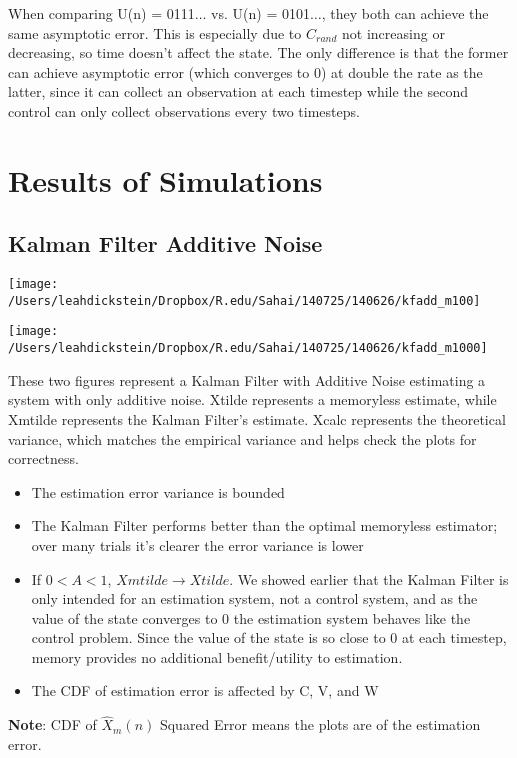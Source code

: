 \documentclass[leqno,twocolumn]{article}
\begin{document}
When comparing U(n) = 0111$\dots$ vs. U(n) = 0101$\dots$, they both can achieve the same asymptotic error. This is especially due to $C_{rand}$ not increasing or decreasing, so time doesn't affect the state. The only difference is that the former can achieve asymptotic error (which converges to 0) at double the rate as the latter, since it can collect an observation at each timestep while the second control can only collect observations every two timesteps.

\onecolumn
\section{Results of Simulations}
\subsection{Kalman Filter Additive Noise}
\begin{minipage}[c]{0.5\textwidth}
\texttt{[image: /Users/leahdickstein/Dropbox/R.edu/Sahai/140725/140626/kfadd\_m100]}
\end{minipage}
\begin{minipage}[c]{0.5\textwidth}
\texttt{[image: /Users/leahdickstein/Dropbox/R.edu/Sahai/140725/140626/kfadd\_m1000]}
\end{minipage}
These two figures represent a Kalman Filter with Additive Noise estimating a system with only additive noise. Xtilde represents a memoryless estimate, while Xmtilde represents the Kalman Filter's estimate. Xcalc represents the theoretical variance, which matches the empirical variance and helps check the plots for correctness.
\begin{itemize}
\item The estimation error variance is bounded
\item The Kalman Filter performs better than the optimal memoryless estimator; over many trials it's clearer the error variance is lower
\item If $0 < A < 1$, $Xmtilde \rightarrow Xtilde$. We showed earlier that the Kalman Filter is only intended for an estimation system, not a control system, and as the value of the state converges to 0 the estimation system behaves like the control problem. Since the value of the state is so close to 0 at each timestep, memory provides no additional benefit/utility to estimation.
\item The CDF of estimation error is affected by C, V, and W
\end{itemize}
\textbf{Note}: CDF of $\hat{X}_m(n)$ Squared Error means the plots are of the estimation error.
\end{document}

